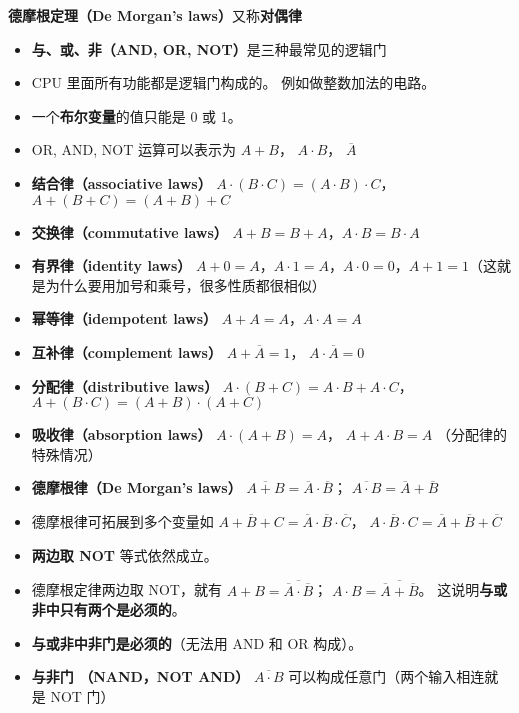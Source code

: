 
\begin{issues}
\issueDraft
\end{issues}

\textbf{德摩根定理（De Morgan's laws）}又称\textbf{对偶律}

\begin{itemize}
\item \textbf{与、或、非（AND, OR, NOT）}是三种最常见的逻辑门
\item CPU 里面所有功能都是逻辑门构成的。 例如做整数加法的电路。
\item 一个\textbf{布尔变量}的值只能是 0 或 1。
\item OR, AND, NOT 运算可以表示为 $A + B$， $A\cdot B$， $\overline A$
\item \textbf{结合律（associative laws）} $A\cdot(B\cdot C) = (A\cdot B)\cdot C$， $A+(B+C)=(A+B)+C$
\item \textbf{交换律（commutative laws）} $A+B=B+A$，$A\cdot B=B\cdot A$
\item \textbf{有界律（identity laws）} $A+0=A$，$A\cdot 1=A$，$A\cdot 0 = 0$，$A+1=1$（这就是为什么要用加号和乘号，很多性质都很相似）
\item \textbf{幂等律（idempotent laws）} $A+A=A$，$A\cdot A=A$
\item \textbf{互补律（complement laws）} $A+\overline A = 1$， $A\cdot \overline A = 0$
\item \textbf{分配律（distributive laws）} $A\cdot(B+C)=A\cdot B+A\cdot C$， $A+(B\cdot C) = (A+B)\cdot(A+C)$
\item \textbf{吸收律（absorption laws）} $A\cdot(A+B) = A$， $A+A\cdot B = A$ （分配律的特殊情况）
\item \textbf{德摩根律（De Morgan's laws）} $\overline{A+B} = \overline A \cdot \overline B$； $\overline{A \cdot B} = \overline A + \overline B$
\item 德摩根律可拓展到多个变量如 $\overline{A+B+C} = \overline A \cdot \overline B \cdot \overline C$， $\overline{A \cdot B\cdot C} = \overline A + \overline B + \overline C$
\item \textbf{两边取 NOT} 等式依然成立。
\item 德摩根定律两边取 NOT，就有 $A+B = \overline{\overline A \cdot \overline B}$； $A \cdot B = \overline{\overline A + \overline B}$。 这说明\textbf{与或非中只有两个是必须的}。
\item \textbf{与或非中非门是必须的}（无法用 AND 和 OR 构成）。
\item \textbf{与非门 （NAND，NOT AND）} $\overline{A\cdot B}$ 可以构成任意门（两个输入相连就是 NOT 门）

\end{itemize}
